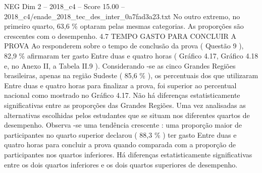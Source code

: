 \begin{textsample}{NEG Dim 2 – 2018\_c4 – Score 15.00 – 2018\_c4/enade\_2018\_tec\_des\_inter\_0a7fad3a23.txt}
No outro extremo, no primeiro quarto, 63,6 \% optaram pelas mesmas categorias.
As proporções são crescentes com o desempenho. 4.7 TEMPO GASTO PARA CONCLUIR A PROVA Ao responderem sobre o tempo de conclusão da prova ( Questão 9 ), 82,9 \% afirmaram ter gasto Entre duas e quatro horas ( Gráfico 4.17, Gráfico 4.18 e, no Anexo II, a Tabela II.9 ).
Considerando -se as cinco Grandes Regiões brasileiras, apenas na região Sudeste ( 85,6 \% ), os percentuais dos que utilizaram Entre duas e quatro horas para finalizar a prova, foi superior ao percentual nacional como mostrado no Gráfico 4.17.
Não há diferenças estatisticamente significativas entre as proporções das Grandes Regiões.
Uma vez analisadas as alternativas escolhidas pelos estudantes que se situam nos diferentes quartos de desempenho.
Observa -se uma tendência crescente : uma proporção maior de participantes no quarto superior declarou ( 88,3 \% ) ter gasto Entre duas e quatro horas para concluir a prova quando comparada com a proporção de participantes nos quartos inferiores.
Há diferenças estatisticamente significativas entre os dois quartos inferiores e os dois quartos superiores de desempenho.

\end{textsample}
